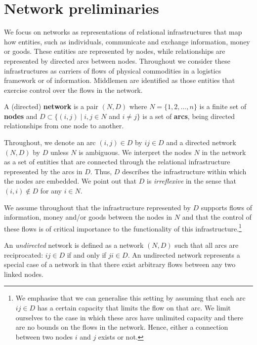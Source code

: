 \section{Network preliminaries}
\label{sec:NetworkPreliminaries}

We focus on networks as representations of relational infrastructures that map how entities, such as individuals, communicate and exchange information, money or goods. These entities are represented by nodes, while relationships are represented by directed arcs between nodes. Throughout we consider these infrastructures as carriers of flows of physical commodities in a logistics framework or of information. Middlemen are identified as those entities that exercise control over the flows in the network.
\begin{definition}
	A (directed) \textbf{network} is a pair $(N,D)$ where $N = \{1,2, \ldots ,n\}$ is a finite set of \textbf{nodes} and $D \subset \{ (i,j) \mid i,j \in N$ and $i \neq j \}$ is a set of \textbf{arcs}, being directed relationships from one node to another.
\end{definition}

\noindent
Throughout, we denote an arc $(i,j) \in D$ by $ij \in D$ and a directed network $(N,D)$ by $D$ unless $N$ is ambiguous. We interpret the nodes $N$ in the network as a set of entities that are connected through the relational infrastructure represented by the arcs in $D$. Thus, $D$ describes the infrastructure within which the nodes are embedded. We point out that $D$ is \emph{irreflexive} in the sense that $(i,i) \notin D$ for any $i \in N$.

We assume throughout that the infrastructure represented by $D$ supports flows of information, money and/or goods between the nodes in $N$ and that the control of these flows is of critical importance to the functionality of this infrastructure.\footnote{We emphasise that we can generalise this setting by assuming that each arc $ij \in D$ has a certain capacity that limits the flow on that arc. We limit ourselves to the case in which these arcs have unlimited capacity and there are no bounds on the flows in the network. Hence, either a connection between two nodes $i$ and $j$ exists or not.}

An \emph{undirected} network is defined as a network $(N,D)$ such that all arcs are reciprocated: $ij \in D$ if and only if $ji \in D$. An undirected network represents a special case of a network in that there exist arbitrary flows between any two linked nodes.

